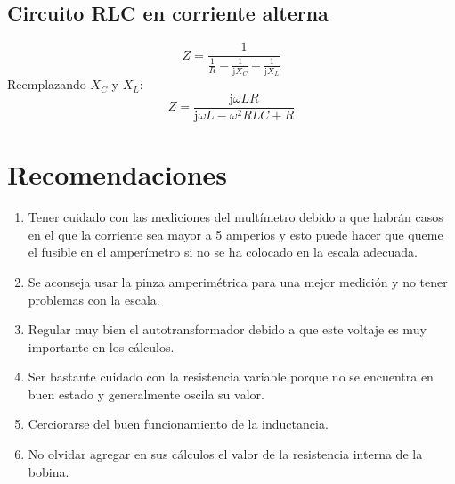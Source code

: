\documentclass[a4paper,12pt]{report}
\begin{document}
\section{Circuito RLC en corriente alterna}
$$
Z = \frac{1}{\frac{1}{R} - \frac{1}{\mathrm{j}X_{C}} + \frac{1}{\mathrm{j}X_{L}}}
$$
Reemplazando $X_{C}$ y $X_{L}$:
$$
Z = \frac{\mathrm{j}\omega L R}{\mathrm{j}\omega L - \omega^{2}RLC + R}
$$
\chapter{Recomendaciones}
\begin{enumerate}
\item Tener cuidado con las mediciones del multímetro debido a que habrán casos en el que la corriente sea mayor a 5 amperios y esto puede hacer que queme el fusible en el amperímetro si no se ha colocado en la escala adecuada.
\item Se aconseja usar la pinza amperimétrica para una mejor medición y no tener problemas con la escala.
\item Regular muy bien el autotransformador debido a que este voltaje es muy importante en los cálculos.
\item Ser bastante cuidado con la resistencia variable porque no se encuentra en buen estado y generalmente oscila su valor.
\item Cerciorarse del buen funcionamiento de la inductancia.
\item No olvidar agregar en sus cálculos el valor de la resistencia interna de la bobina.
\end{enumerate}
\end{document}
